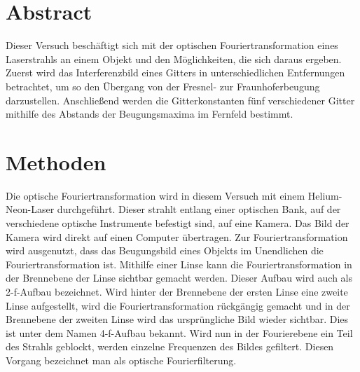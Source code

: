 \section{Abstract}
Dieser Versuch beschäftigt sich mit der optischen Fouriertransformation eines Laserstrahls an einem Objekt und den Möglichkeiten, die sich daraus ergeben. Zuerst wird das Interferenzbild eines Gitters in unterschiedlichen Entfernungen betrachtet, um so den Übergang von der Fresnel- zur Fraunhoferbeugung darzustellen. Anschließend werden die Gitterkonstanten fünf verschiedener Gitter mithilfe des Abstands der Beugungsmaxima im Fernfeld bestimmt.

\section{Methoden}
Die optische Fouriertransformation wird in diesem Versuch mit einem Helium-Neon-Laser durchgeführt. Dieser strahlt entlang einer optischen Bank, auf der verschiedene optische Instrumente befestigt sind, auf eine Kamera. Das Bild der Kamera wird direkt auf einen Computer übertragen. Zur Fouriertransformation wird ausgenutzt, dass das Beugungsbild eines Objekts im Unendlichen die Fouriertransformation ist. Mithilfe einer Linse kann die Fouriertransformation in der Brennebene der Linse sichtbar gemacht werden. Dieser Aufbau wird auch als 2-f-Aufbau bezeichnet. Wird hinter der Brennebene der ersten Linse eine zweite Linse aufgestellt, wird die Fouriertransformation rückgängig gemacht und in der Brennebene der zweiten Linse wird das ursprüngliche Bild wieder sichtbar. Dies ist unter dem Namen 4-f-Aufbau bekannt. Wird nun in der Fourierebene ein Teil des Strahls geblockt, werden einzelne Frequenzen des Bildes gefiltert. Diesen Vorgang bezeichnet man als optische Fourierfilterung.

